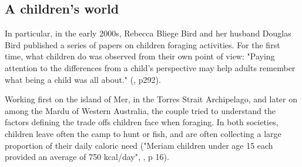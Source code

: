 \subsection{A children's world}

In particular, in the early 2000s, Rebecca Bliege Bird and her husband Douglas Bird published a series of papers on children foraging activities. For the first time, what children do was observed from their own point of view: "Paying attention to the differences from a child's perspective may help adults remember what being a child was all about." (\cite{bird_children_2002}, p292).

Working first on the island of Mer, in the Torres Strait Archipelago, and later on among the Mardu of Western Australia, the couple tried to understand the factors defining the trade offs children face when foraging. In both societies, children leave often the camp to hunt or fish, and are often collecting a large proportion of their daily caloric need ("Meriam children under age 15 each provided an average of 750 kcal/day", \cite{bliege_bird_children_1995}, p 16).

